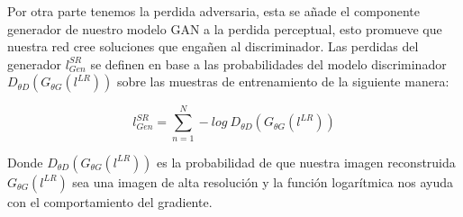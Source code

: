 Por otra parte tenemos la perdida adversaria, esta se añade el componente generador de nuestro modelo GAN a la perdida perceptual,
esto promueve que nuestra red cree soluciones que engañen al discriminador. Las perdidas del generador $l_{Gen}^{SR}$ se definen
en base a las probabilidades del modelo discriminador $D_{\theta D}(G_{\theta G}(l^{LR}))$ sobre las muestras de entrenamiento
de la siguiente manera:

\begin{equation}
  l_{Gen}^{SR}=\sum_{n=1}^{N}-log \ D_{\theta D}(G_{\theta G}(l^{LR}))
\end{equation}


Donde $D_{\theta D}(G_{\theta G}(l^{LR}))$ es la probabilidad de que nuestra imagen reconstruida $G_{\theta G}(l^{LR})$ sea 
una imagen de alta resolución y la función logarítmica nos ayuda con el comportamiento del gradiente. 


